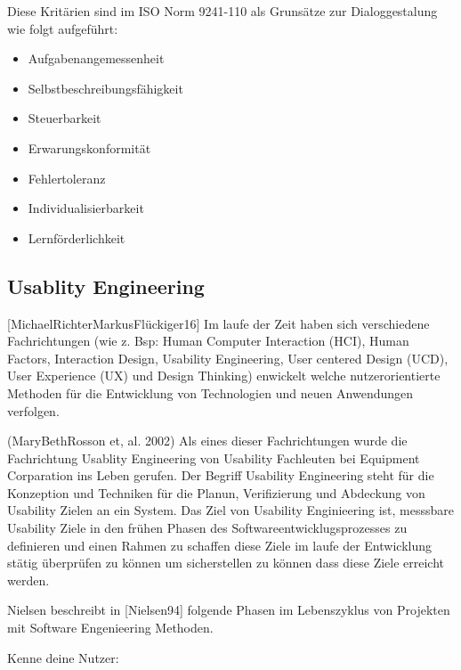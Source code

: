 Diese Kritärien sind im  ISO Norm  9241-110 als Grunsätze zur Dialoggestalung wie folgt aufgeführt: %

\begin{itemize}
	\item Aufgabenangemessenheit
	\item Selbstbeschreibungsfähigkeit
	\item Steuerbarkeit
	\item Erwarungskonformität
	\item Fehlertoleranz
	\item Individualisierbarkeit
	\item Lernförderlichkeit
\end{itemize}

\subsection{Usablity Engineering}

[MichaelRichterMarkusFlückiger16]  Im laufe der Zeit haben sich verschiedene Fachrichtungen (wie z. Bsp: Human Computer Interaction (HCI), Human Factors, Interaction Design, Usability Engineering, 
User centered Design (UCD), User Experience (UX) und Design Thinking)  enwickelt welche nutzerorientierte Methoden für die Entwicklung von Technologien und neuen Anwendungen verfolgen. 

(MaryBethRosson et, al. 2002) Als eines dieser Fachrichtungen wurde die Fachrichtung Usablity Engineering von Usability Fachleuten bei Equipment Corparation 
ins Leben gerufen.  Der Begriff Usability Engineering steht für die Konzeption und Techniken für die Planun, Verifizierung und Abdeckung von Usability Zielen an ein System.  
Das Ziel von Usability Enginieering ist, messsbare Usability Ziele in den frühen Phasen des Softwareentwicklugsprozesses zu definieren und einen Rahmen zu schaffen diese 
Ziele im laufe der Entwicklung stätig überprüfen zu können um sicherstellen zu können dass diese Ziele erreicht werden.

Nielsen beschreibt in [Nielsen94] folgende Phasen im Lebenszyklus von Projekten mit Software Engenieering Methoden.

Kenne deine Nutzer:  

